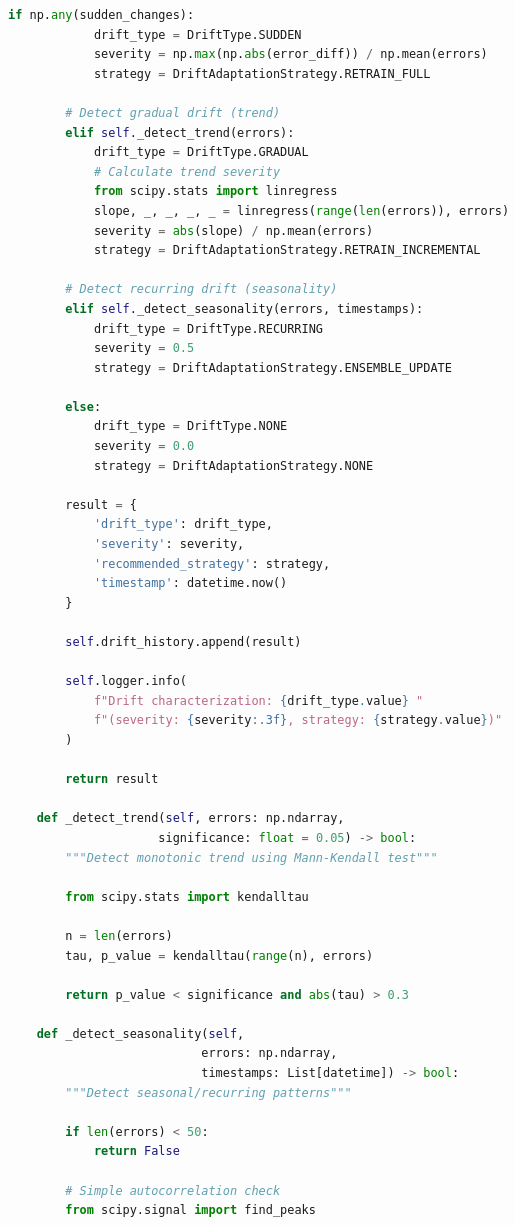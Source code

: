 \begin{lstlisting}[language=Python, caption=Multi-Strategy Drift Adaptation Framework]
        if np.any(sudden_changes):
            drift_type = DriftType.SUDDEN
            severity = np.max(np.abs(error_diff)) / np.mean(errors)
            strategy = DriftAdaptationStrategy.RETRAIN_FULL

        # Detect gradual drift (trend)
        elif self._detect_trend(errors):
            drift_type = DriftType.GRADUAL
            # Calculate trend severity
            from scipy.stats import linregress
            slope, _, _, _, _ = linregress(range(len(errors)), errors)
            severity = abs(slope) / np.mean(errors)
            strategy = DriftAdaptationStrategy.RETRAIN_INCREMENTAL

        # Detect recurring drift (seasonality)
        elif self._detect_seasonality(errors, timestamps):
            drift_type = DriftType.RECURRING
            severity = 0.5
            strategy = DriftAdaptationStrategy.ENSEMBLE_UPDATE

        else:
            drift_type = DriftType.NONE
            severity = 0.0
            strategy = DriftAdaptationStrategy.NONE

        result = {
            'drift_type': drift_type,
            'severity': severity,
            'recommended_strategy': strategy,
            'timestamp': datetime.now()
        }

        self.drift_history.append(result)

        self.logger.info(
            f"Drift characterization: {drift_type.value} "
            f"(severity: {severity:.3f}, strategy: {strategy.value})"
        )

        return result

    def _detect_trend(self, errors: np.ndarray,
                     significance: float = 0.05) -> bool:
        """Detect monotonic trend using Mann-Kendall test"""

        from scipy.stats import kendalltau

        n = len(errors)
        tau, p_value = kendalltau(range(n), errors)

        return p_value < significance and abs(tau) > 0.3

    def _detect_seasonality(self,
                           errors: np.ndarray,
                           timestamps: List[datetime]) -> bool:
        """Detect seasonal/recurring patterns"""

        if len(errors) < 50:
            return False

        # Simple autocorrelation check
        from scipy.signal import find_peaks


\end{lstlisting}
